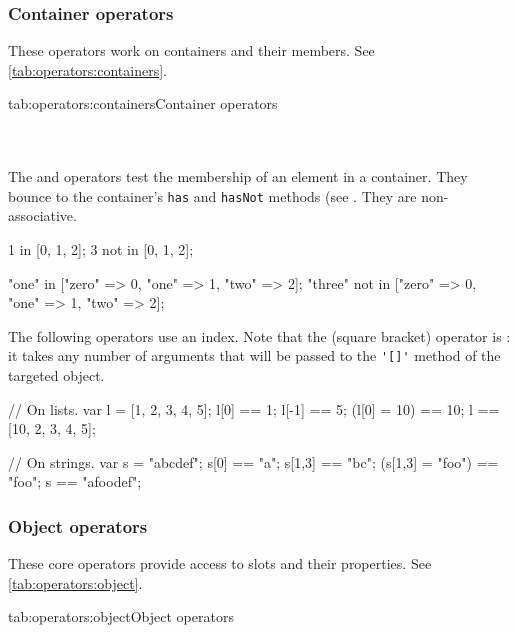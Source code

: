\subsubsection{Container operators}
\label{sec:lang:op:containers}

These operators work on containers and their members. See
\autoref{tab:operators:containers}.
\begin{operatorTable}{tab:operators:containers}{Container operators}
  \operatorsub\\\operatorsubass
  \\\hline
  \operatorin\\\operatornotin
\end{operatorTable}

The  and  operators test the membership of an element in
a container.  They bounce to the container's \lstinline{has} and
\lstinline{hasNot} methods (see .  They are
non-associative.

\begin{urbiassert}
1     in [0, 1, 2];
3 not in [0, 1, 2];

"one"   in     ["zero" => 0, "one" => 1, "two" => 2];
"three" not in ["zero" => 0, "one" => 1, "two" => 2];
\end{urbiassert}

The following operators use an index. Note that the
 (square bracket) operator is
: it takes any number of arguments that will be passed to the
\lstinline|'[]'| method of the targeted object.

\begin{urbiassert}
// On lists.
var l = [1, 2, 3, 4, 5];
  l[0] == 1;
  l[-1] == 5;
  (l[0] = 10) == 10;
  l == [10, 2, 3, 4, 5];

// On strings.
var s = "abcdef";
  s[0] == "a";
  s[1,3] == "bc";
  (s[1,3] = "foo") == "foo";
  s == "afoodef";
\end{urbiassert}


\subsubsection{Object operators}

These core operators provide access to slots and their properties. See
\autoref{tab:operators:object}.



\begin{operatorTable}{tab:operators:object}{Object operators}
  \operatordot\\\operatordota
  \\\hline
  \operatorprop\\\operatorpropass
  \\\hline
  \operatoruand\\\operatordotand
\end{operatorTable}

